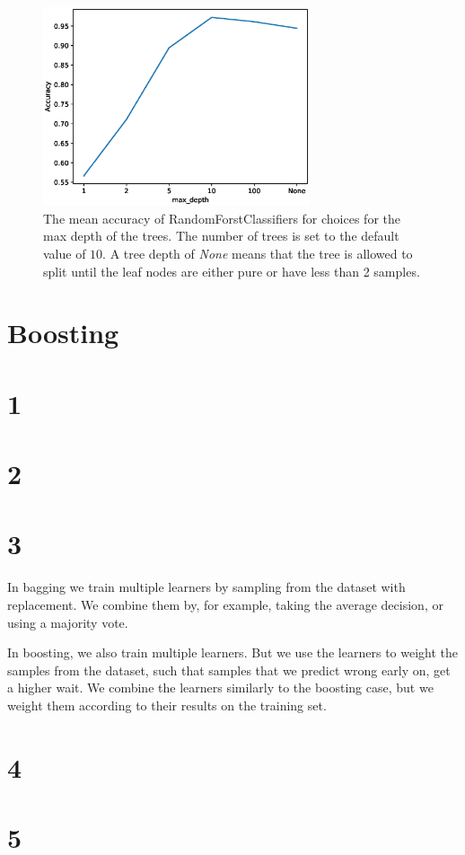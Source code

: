 \documentclass[11pt]{article}
\begin{document}
\begin{figure}[H]
\centering
\includegraphics[width=0.7\textwidth]{images/mnist_lines.eps}
\caption{The mean accuracy of RandomForstClassifiers for choices for the max depth of the trees. The number of trees is set to the default value of $10$. A tree depth of \textit{None} means that the tree is allowed to split until the leaf nodes are either pure or have less than 2 samples.}
\label{fig:mnist_lines}
\end{figure}

\section*{Boosting}

\section*{1}


\section*{2}

\section*{3}

In bagging we train multiple learners by sampling from the dataset with replacement. We combine them by, for example, taking the average decision, or using a majority vote.

In boosting, we also train multiple learners. But we use the learners to weight the samples from the dataset, such that samples that we predict wrong early on, get a higher wait. We combine the learners similarly to the boosting case, but we weight them according to their results on the training set.

\section*{4}

\section*{5}
\end{document}
